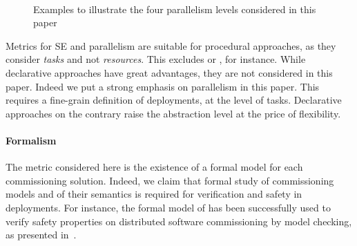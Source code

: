 \begin{figure*}[t!]
  \begin{center}
    \\

    \caption{Examples to illustrate the four parallelism levels
      considered in this paper}
    \label{fig:parlevels}
  \end{center}
\end{figure*}


Metrics for SE and parallelism are suitable for procedural approaches,
as they consider \emph{tasks} and not \emph{resources}. This excludes
\puppet or \salt, for instance. While declarative approaches have great
advantages, they are not considered in this paper. Indeed we put a strong emphasis on parallelism in this paper. This requires a fine-grain definition of deployments, at the level of tasks. Declarative approaches on the contrary raise the abstraction level at the price of flexibility.

\paragraph{Formalism}
The metric considered here is the existence of a formal model for each
commissioning solution. Indeed, we claim that formal study of
commissioning models and of their semantics is required for
verification and safety in deployments. For instance, the formal model
of \mad has been successfully used to verify safety properties on
distributed software commissioning by model checking, as presented
in~\cite{coullon:hal-02323641}.

